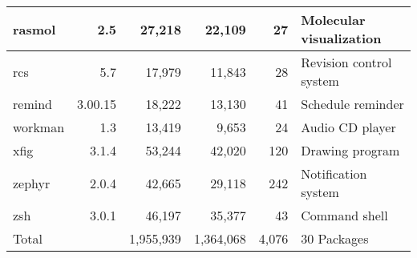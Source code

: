 \begin{tabular}{|l|r|r|r|r|l|}
rasmol & 2.5 & 27,218 & 22,109 & 27 & Molecular visualization\\\hline
rcs & 5.7 & 17,979 & 11,843 & 28 & Revision control system \\\hline
remind & 3.00.15 & 18,222 & 13,130 & 41 & Schedule reminder \\\hline
workman & 1.3 & 13,419 & 9,653 & 24 & Audio CD player \\\hline
xfig & 3.1.4 & 53,244 & 42,020 & 120 & Drawing program \\\hline
zephyr & 2.0.4 & 42,665 & 29,118 & 242 & Notification system \\\hline
zsh & 3.0.1 & 46,197 & 35,377 & 43 & Command shell \\\hline
\hline
Total & & 1,955,939 & 1,364,068 & 4,076 & 30 Packages\\\hline
\end{tabular}

